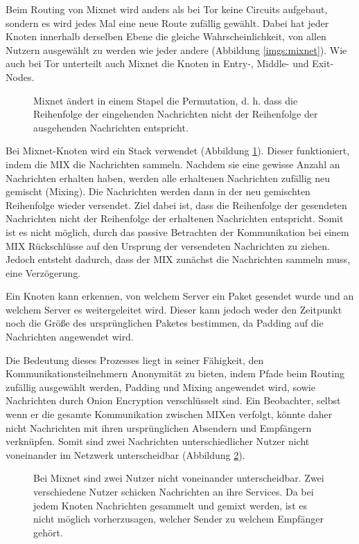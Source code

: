Beim Routing von Mixnet wird anders als bei Tor keine Circuits aufgebaut, sondern es wird jedes Mal eine neue Route zufällig gewählt. Dabei hat jeder Knoten innerhalb derselben Ebene die gleiche Wahrscheinlichkeit, von allen Nutzern ausgewählt zu werden wie jeder andere (Abbildung \ref{imgs:mixnet})\cite{MixnetRouteAlgorithm}. Wie auch bei Tor unterteilt auch Mixnet die Knoten in Entry-, Middle- und Exit-Nodes.

\begin{figure}[h!]
    \centering
    
    \caption{Mixnet ändert in einem Stapel die Permutation, d. h. dass die Reihenfolge der eingehenden Nachrichten nicht der Reihenfolge der ausgehenden Nachrichten entspricht.}
    \label{imgs:mixnet_stack}
\end{figure}

Bei Mixnet-Knoten wird ein Stack verwendet (Abbildung \ref{imgs:mixnet_stack}). Dieser funktioniert, indem die MIX die Nachrichten sammeln. Nachdem sie eine gewisse Anzahl an Nachrichten erhalten haben, werden alle erhaltenen Nachrichten zufällig neu gemischt (Mixing). Die Nachrichten werden dann in der neu gemischten Reihenfolge wieder versendet. Ziel dabei ist, dass die Reihenfolge der gesendeten Nachrichten nicht der Reihenfolge der erhaltenen Nachrichten entspricht. Somit ist es nicht möglich, durch das passive Betrachten der Kommunikation bei einem MIX Rückschlüsse auf den Ursprung der versendeten Nachrichten zu ziehen. Jedoch entsteht dadurch, dass der MIX zunächst die Nachrichten sammeln muss, eine Verzögerung\cite{MixnetStack}.

Ein Knoten kann erkennen, von welchem Server ein Paket gesendet wurde und an welchem Server es weitergeleitet wird. Dieser kann jedoch weder den Zeitpunkt noch die Größe des ursprünglichen Paketes bestimmen, da Padding auf die Nachrichten angewendet wird.

Die Bedeutung dieses Prozesses liegt in seiner Fähigkeit, den Kommunikationsteilnehmern Anonymität zu bieten, indem Pfade beim Routing zufällig ausgewählt werden, Padding und Mixing angewendet wird, sowie Nachrichten durch Onion Encryption verschlüsselt sind. Ein Beobachter, selbst wenn er die gesamte Kommunikation zwischen MIXen verfolgt, könnte daher nicht Nachrichten mit ihren ursprünglichen Absendern und Empfängern verknüpfen. Somit sind zwei Nachrichten unterschiedlicher Nutzer nicht voneinander im Netzwerk unterscheidbar (Abbildung \ref{imgs:mixnet_transfer}).

\begin{figure}[ht!]
    \centering
    
    \caption{Bei Mixnet sind zwei Nutzer nicht voneinander unterscheidbar. Zwei verschiedene Nutzer schicken Nachrichten an ihre Services. Da bei jedem Knoten Nachrichten gesammelt und gemixt werden, ist es nicht möglich vorherzusagen, welcher Sender zu welchem Empfänger gehört.}
    \label{imgs:mixnet_transfer}
\end{figure}

